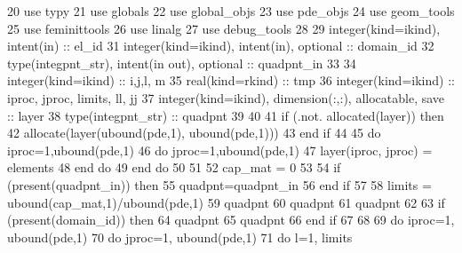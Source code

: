 \begin{DoxyCode}
20       \textcolor{keywordtype}{use }typy
21       \textcolor{keywordtype}{use }globals
22       \textcolor{keywordtype}{use }global_objs
23       \textcolor{keywordtype}{use }pde_objs
24       \textcolor{keywordtype}{use }geom_tools
25       \textcolor{keywordtype}{use }feminittools
26       \textcolor{keywordtype}{use }linalg
27       \textcolor{keywordtype}{use }debug_tools
28 
29       \textcolor{keywordtype}{integer(kind=ikind)}, \textcolor{keywordtype}{intent(in)} :: el\_id
31       \textcolor{keywordtype}{integer(kind=ikind)}, \textcolor{keywordtype}{intent(in)}, \textcolor{keywordtype}{optional} :: domain\_id
32       \textcolor{keywordtype}{type}(integpnt_str), \textcolor{keywordtype}{intent(in out)}, \textcolor{keywordtype}{optional} :: quadpnt\_in
33       
34       \textcolor{keywordtype}{integer(kind=ikind)} :: i,j,l, m
35       \textcolor{keywordtype}{real(kind=rkind)} :: tmp
36       \textcolor{keywordtype}{integer(kind=ikind)} :: iproc, jproc, limits, ll, jj
37       \textcolor{keywordtype}{integer(kind=ikind)}, \textcolor{keywordtype}{dimension(:,:)}, \textcolor{keywordtype}{allocatable}, \textcolor{keywordtype}{save} :: layer
38       \textcolor{keywordtype}{type}(integpnt_str) :: quadpnt
39 
40 
41       \textcolor{keywordflow}{if} (.not. \textcolor{keyword}{allocated}(layer)) \textcolor{keywordflow}{then}
42         \textcolor{keyword}{allocate}(layer(ubound(pde,1), ubound(pde,1)))
43 \textcolor{keywordflow}{      end if}
44 
45       \textcolor{keywordflow}{do} iproc=1,ubound(pde,1)
46         \textcolor{keywordflow}{do} jproc=1,ubound(pde,1)
47             layer(iproc, jproc) = elements%
48 \textcolor{keywordflow}{        end do}
49 \textcolor{keywordflow}{      end do}
50 
51 
52       cap_mat = 0
53       
54       \textcolor{keywordflow}{if} (\textcolor{keyword}{present}(quadpnt\_in)) \textcolor{keywordflow}{then}
55         quadpnt=quadpnt\_in
56 \textcolor{keywordflow}{      end if}
57 
58       limits = ubound(cap_mat,1)/ubound(pde,1)
59       quadpnt%
60       quadpnt%
61       quadpnt%
62       
63       \textcolor{keywordflow}{if} (\textcolor{keyword}{present}(domain\_id)) \textcolor{keywordflow}{then}
64         quadpnt%
65         quadpnt%
66 \textcolor{keywordflow}{      end if}
67       
68 
69       \textcolor{keywordflow}{do} iproc=1, ubound(pde,1)
70         \textcolor{keywordflow}{do} jproc=1, ubound(pde,1)
71           \textcolor{keywordflow}{do} l=1,  limits

\end{DoxyCode}
